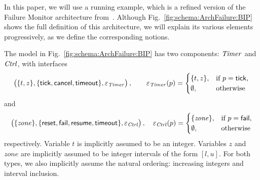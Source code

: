 \documentclass{llncs}
\newcommand{\fig}[1]{Fig.~\ref{fig:#1}}
\newcommand{\ie}[1][\ ]{i.e.#1}
\newcommand{\export}[1][]{\ensuremath{\varepsilon_{#1}}}
\begin{document}
In this paper, we will use a running example, which is a refined
version of the Failure Monitor architecture
from~\cite{CubETH-case-study}.  Although \fig{schema:ArchFailure:BIP}
shows the full definition of this architecture, we will explain its
various elements progressively, as we define the corresponding
notions.

The model in \fig{schema:ArchFailure:BIP} has two components:
%
$\mathit{Timer}$ and $\mathit{Ctrl}$, with interfaces
\[\bigl(
\{t, z\},
\{\PortTick, \PortCancel, \PortTO\},
\export[\NameTimer]
\bigr)\,,
\qquad
\export[\NameTimer](p) =
\begin{cases}
  \{t, z\}, & \text{if } p = \PortTick,\\
  \emptyset, & \text{otherwise}
\end{cases}
\]
and
\[\bigl(
\{\mathit{zone}\},
\{\PortReset, \PortFail, \PortResume, \PortTO\},
\export[\NameCtrl]
\bigr)\,,
\quad
\export[\NameCtrl](p) =
\begin{cases}
  \{\mathit{zone}\}, & \text{if } p = \PortFail,\\
  \emptyset, & \text{otherwise}
\end{cases}
\]
%
respectively. %
Variable $t$ is implicitly assumed to be an integer.  Variables $z$
and $\mathit{zone}$ are implicitly assumed to be integer intervals of
the form $[l,u]$.  For both types, we also implicitly assume the
natural ordering: increasing integers and interval inclusion.
\end{document}
